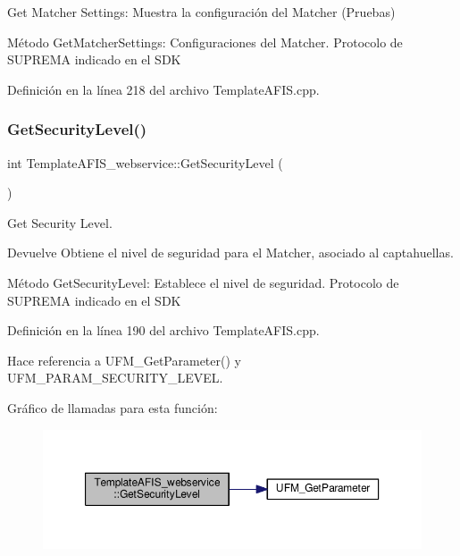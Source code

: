 Get Matcher Settings\+: Muestra la configuración del Matcher (Pruebas) 

Método Get\+Matcher\+Settings\+: Configuraciones del Matcher. Protocolo de S\+U\+P\+R\+E\+MA indicado en el S\+DK 

Definición en la línea 218 del archivo Template\+A\+F\+I\+S.\+cpp.

\hypertarget{classTemplateAFIS__webservice_a664f93880a7054b22a2b1faaacda95c3}{}\label{classTemplateAFIS__webservice_a664f93880a7054b22a2b1faaacda95c3} 
\subsubsection{\texorpdfstring{Get\+Security\+Level()}{GetSecurityLevel()}}
{\footnotesize\ttfamily int Template\+A\+F\+I\+S\+\_\+webservice\+::\+Get\+Security\+Level (\begin{DoxyParamCaption}{ }\end{DoxyParamCaption})}



Get Security Level. 

\begin{DoxyReturn}{Devuelve}
Obtiene el nivel de seguridad para el Matcher, asociado al captahuellas.
\end{DoxyReturn}
Método Get\+Security\+Level\+: Establece el nivel de seguridad. Protocolo de S\+U\+P\+R\+E\+MA indicado en el S\+DK 

Definición en la línea 190 del archivo Template\+A\+F\+I\+S.\+cpp.



Hace referencia a U\+F\+M\+\_\+\+Get\+Parameter() y U\+F\+M\+\_\+\+P\+A\+R\+A\+M\+\_\+\+S\+E\+C\+U\+R\+I\+T\+Y\+\_\+\+L\+E\+V\+EL.

Gráfico de llamadas para esta función\+:\nopagebreak
\begin{figure}[H]
\begin{center}
\leavevmode
\includegraphics[width=350pt]{classTemplateAFIS__webservice_a664f93880a7054b22a2b1faaacda95c3_cgraph}
\end{center}
\end{figure}
\hypertarget{classTemplateAFIS__webservice_a11ad395942529648ef3a9ddf43df3262}{}\label{classTemplateAFIS__webservice_a11ad395942529648ef3a9ddf43df3262} 
